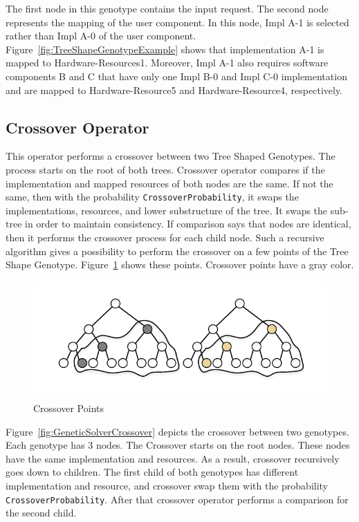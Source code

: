 The first node in this genotype contains the input request. The second node represents the mapping of the user component. In this node, Impl A-1 is selected rather than Impl A-0 of the user component. Figure~\ref{fig:TreeShapeGenotypeExample} shows that implementation A-1 is mapped to Hardware-Resources1. Moreover, Impl A-1 also requires software components B and C that have only one Impl B-0 and Impl C-0 implementation and are mapped to Hardware-Resource5 and Hardware-Resource4, respectively.

\subsection{Crossover Operator}
\label{sec:GeneticSolverCrossover}

This operator performs a crossover between two Tree Shaped Genotypes. The process starts on the root of both trees. Crossover operator compares if the implementation and mapped resources of both nodes are the same. If not the same, then with the probability \texttt{CrossoverProbability}, it swaps the implementations, resources, and lower substructure of the tree. It swaps the sub-tree in order to maintain consistency. If comparison says that nodes are identical, then it performs the crossover process for each child node. Such a recursive algorithm gives a possibility to perform the crossover on a few points of the Tree Shape Genotype.
Figure~\ref{fig:CrossoverPoints} shows these points. Crossover points have a gray color.

\begin{figure}
	\centering
	\includegraphics[width=\textwidth]{images/CrossoverPoints.pdf}
	\caption[Crossover Points]{Crossover Points}
	\label{fig:CrossoverPoints}
\end{figure}

Figure~\ref{fig:GeneticSolverCrossover} depicts the crossover between two genotypes. Each genotype has 3 nodes. The Crossover starts on the root nodes. These nodes have the same implementation and resources. As a result, crossover recursively goes down to children. The first child of both genotypes has different implementation and resource, and crossover swap them with the probability \texttt{CrossoverProbability}. After that crossover operator performs a comparison for the second child.


